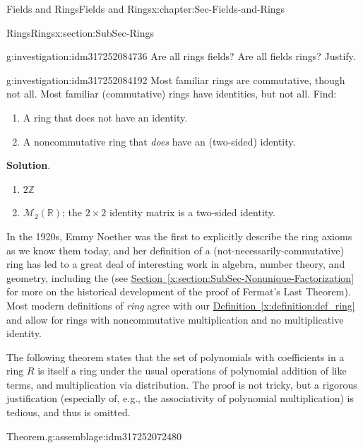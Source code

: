 \documentclass[oneside,10pt,]{book}
\newcommand{\blocktitlefont}{\relax}
\newcommand{\xreffont}{\relax}
\numberwithin{equation}{section}
\def\Z{{\mathbb Z}}
\def\R{{\mathbb R}}
\begin{document}
\begin{chapterptx}{Fields and Rings}{}{Fields and Rings}{}{}{x:chapter:Sec-Fields-and-Rings}
\begin{sectionptx}{Rings}{}{Rings}{}{}{x:section:SubSec-Rings}
\begin{investigation}{}{g:investigation:idm317252084736}%
Are all rings fields? Are all fields rings? Justify.%
\end{investigation}
\begin{investigation}{}{g:investigation:idm317252084192}%
Most familiar rings are commutative, though not all. Most familiar (commutative) rings have identities, but not all. Find:%
\begin{enumerate}
\item{}A ring that does not have an identity\footnotemark{}.%
\item{}A noncommutative ring that \emph{does} have an (two-sided) identity.%
\end{enumerate}
%
\par\smallskip%
\noindent\textbf{\blocktitlefont Solution}.\hypertarget{g:solution:idm317252084480}{}\quad{}%
\begin{enumerate}
\item{}\(2\Z\)%
\item{}\(\mathcal{M}_2(\R)\); the \(2\times 2\) identity matrix is a two-sided identity.%
\end{enumerate}
%
\end{investigation}
%
In the 1920s, Emmy Noether was the first to explicitly describe the ring axioms as we know them today, and her definition of a (not-necessarily-commutative) ring has led to a great deal of interesting work in algebra, number theory, and geometry, including the (see \hyperref[x:section:SubSec-Nonunique-Factorization]{Section~{\xreffont\ref{x:section:SubSec-Nonunique-Factorization}}} for more on the historical development of the proof of Fermat's Last Theorem). Most modern definitions of \emph{ring} agree with our \hyperref[x:definition:def_ring]{Definition~{\xreffont\ref{x:definition:def_ring}}} and allow for rings with noncommutative multiplication and no multiplicative identity.%
\par
The following theorem states that the set of polynomials with coefficients in a ring \(R\) is itself a ring under the usual operations of polynomial addition of like terms, and multiplication via distribution. The proof is not tricky, but a rigorous justification (especially of, e.g., the associativity of polynomial multiplication) is tedious, and thus is omitted.%
\begin{assemblage}{Theorem.}{g:assemblage:idm317252072480}%

\end{assemblage}
\end{sectionptx}
\end{chapterptx}
\end{document}
